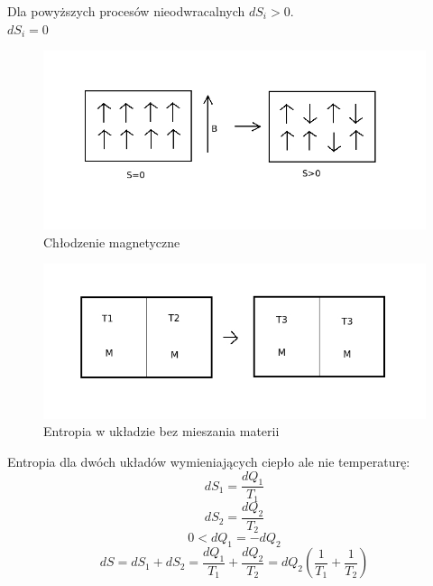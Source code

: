 \documentclass{article}
\begin{document}
			Dla powyższych procesów nieodwracalnych $dS_i > 0$. \\
			$dS_i = 0 $
			\begin{figure}[ht]
			\label{fig:fig1}
			\centering
			\includegraphics[scale=0.6]{chlodzeniemagnetyczne.jpeg}
			\caption{Chłodzenie magnetyczne}
			\end{figure}

			\begin{figure}[ht]
				\label{fig:fig1}
				\centering
				\includegraphics[scale=0.6]{temperatury.jpeg}
				\caption{Entropia w układzie bez mieszania materii}
			\end{figure}
			
			Entropia dla dwóch układów wymieniających ciepło ale nie temperaturę:
			$$dS_1 = \frac{dQ_1}{T_1}$$		
			$$dS_2 = \frac{dQ_2}{T_2}$$
			$$0 < dQ_1 = -dQ_2$$
			$$dS = dS_1 + dS_2 = \frac{dQ_1}{T_1} + \frac{dQ_2}{T_2} = dQ_2(\frac{1}{T_1} + \frac{1}{T_2})$$	
			
\end{document}
